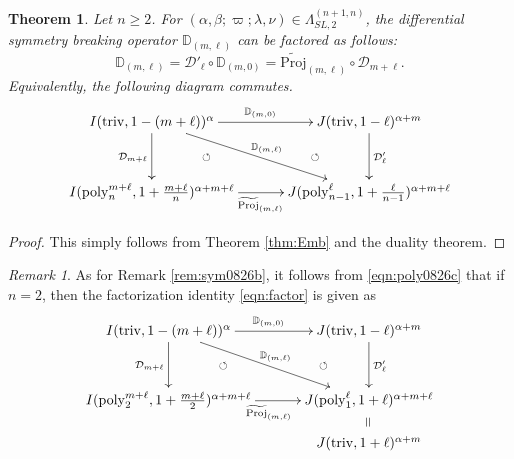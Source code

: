 \documentclass[reqno,11pt]{amsart}
\newtheorem{thm}[equation]{Theorem}
\theoremstyle{remark}
\newtheorem{rem}[equation]{Remark}
\theoremstyle{definition}
\numberwithin{equation}{section}
\newcommand{\gb}{\beta}
\newcommand{\ga}{\alpha}
\newcommand{\gL}{\Lambda}
\newcommand{\Cal}{\mathcal}
\newcommand{\poly}{\mathrm{poly}}
\newcommand{\triv}{\mathrm{triv}}
\newcommand{\wProj}{\widetilde{\mathrm{Proj}}}
\newcommand{\D}{\Cal{D}}
\newcommand{\bD}{\mathbb{D}}
\begin{document}
\begin{thm}\label{thm:Proj}
Let $n\geq 2$. For
$(\ga,\gb;\varpi;\lambda ,\nu) \in 
\gL^{(n+1,n)}_{SL,2}$,
the differential symmetry breaking operator
$\bD_{(m,\ell)}$ can be factored as follows:
\begin{equation*}
\bD_{(m,\ell)} 
= \D'_\ell \circ \bD_{(m,0)}
=  \wProj_{(m,\ell)}\circ \D_{m+\ell}.
\end{equation*}
Equivalently, the following diagram commutes.
\begin{equation}\label{eqn:factor}
\begin{aligned}
\xymatrix@=13pt{
I(\triv, 1-(m+\ell))^\ga
 \ar[dd]_{\D_{m+\ell}}
  \ar[rrdd]^{\bD_{(m,\ell)}}
  \ar[rr]^{\bD_{(m,0)}}
 && J(\triv, 1-\ell)^{\ga+m}
  \ar[dd]^{\D'_\ell}
  \ar@{}[ldd]|{\circlearrowleft}
 \\
&&\\
I(\poly^{m+\ell}_n, 1+\tfrac{m+\ell}{n})^{\ga+m+\ell}
\ar[rr]_{\wProj_{(m,\ell)}}   \ar@{}[ruu]|{\circlearrowleft}
&&
J(\poly^\ell_{n-1}, 1+\tfrac{\ell}{n-1})^{\ga+m+\ell}
}
\end{aligned}
\end{equation}

\end{thm}

\begin{proof}
This simply follows from Theorem \ref{thm:Emb} and the duality theorem.
\end{proof}

\begin{rem}
As for Remark \ref{rem:sym0826b},
it follows from \eqref{eqn:poly0826c} that if $n=2$, then the factorization 
identity \eqref{eqn:factor} is given as
\begin{equation*}
\begin{aligned}
\xymatrix@=13pt{
I(\triv, 1-(m+\ell))^\ga
 \ar[dd]_{\D_{m+\ell}}
  \ar[rrdd]^{\bD_{(m,\ell)}}
  \ar[rr]^{\bD_{(m,0)}}
 && J(\triv, 1-\ell)^{\ga+m}
  \ar[dd]^{\D'_\ell}
  \ar@{}[ldd]|{\circlearrowleft}
 \\
&&\\
I(\poly^{m+\ell}_2, 1+\tfrac{m+\ell}{2})^{\ga+m+\ell}
\ar[rr]_{\wProj_{(m,\ell)}}   \ar@{}[ruu]|{\circlearrowleft}
&&
J(\poly^\ell_{1}, 1+\ell)^{\ga+m+\ell}
\ar@{}[d]|{\rotatebox{90}{$=$}}\\
&&
J(\triv, 1+\ell)^{\ga+m}
}
\end{aligned}
\end{equation*}

\end{rem}
\end{document}
